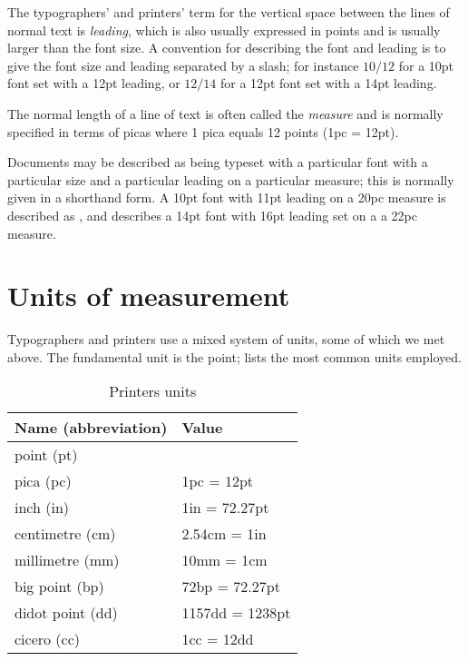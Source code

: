 \documentclass[10pt,a4paper,extrafontsizes]{memoir}
\begin{document}
\begin{paracol}{2}
\switchEng
    The typographers' and printers' term for the vertical space between
the lines of normal text is \emph{leading}, which is also
usually expressed in points and is usually larger than the font size.
A convention for describing the font and leading is to give the font size 
and leading separated by a slash; for instance $10/12$ for a
10pt font set with a 12pt leading, or $12/14$ for a 12pt font set with a
14pt leading.

    The normal length of a line of text is often called the 
\emph{measure} and is normally specified in terms of
picas where 1 pica equals 12 points (1pc = 12pt).

    Documents may be described as being typeset with a particular font
with a particular size and a particular leading on a particular measure;
this is normally given in a shorthand form. 
A 10pt font with 11pt leading on a 20pc measure is described as
, and  describes a 14pt font
with 16pt leading set on a a 22pc measure.
\end{paracol}


\section{Units of measurement}

\begin{paracol}{2}
\switchEng
    Typographers and printers use a mixed system of units, some of which
we met above. The fundamental unit is the point;  lists 
the most common units employed.
\end{paracol}

\begin{table}
\centering
\caption{Printers units} \label{tab:units}
\begin{tabular}{ll} \toprule
Name (abbreviation) & Value \\ \midrule
point (pt)\index{point}\index{pt}          &            \\
pica (pc)\index{pica}\index{pc}           & 1pc = 12pt \\
inch (in)\index{inch}\index{in}           & 1in = 72.27pt \\
centimetre (cm)\index{centimetre}\index{cm}     & 2.54cm = 1in \\
millimetre (mm)\index{millimetre}\index{mm}     & 10mm = 1cm \\ 
big point (bp)\index{big point}\index{bp}      & 72bp = 72.27pt \\
didot point (dd)\index{didot point}\index{dd}    & 1157dd = 1238pt \\
cicero (cc)\index{cicero}\index{cc}         & 1cc = 12dd \\
\bottomrule
\end{tabular}
\end{table}
\end{document}

